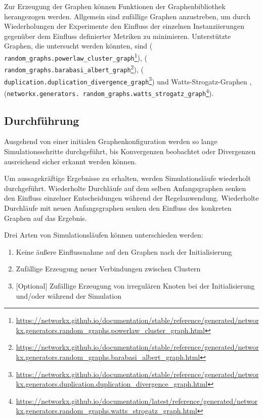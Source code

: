 \documentclass[11pt, a4paper]{scrartcl}
\newcommand{\nx}[1]{\texttt{#1}}
\begin{document}
Zur Erzeugung der Graphen können Funktionen der Graphenbibliothek \autocite{networkx} herangezogen werden. Allgemein sind zufällige Graphen anzustreben, um durch Wiederholungen der Experimente den Einfluss der einzelnen Instanziierungen gegenüber dem Einfluss definierter Metriken zu minimieren.
Unterstützte Graphen, die untersucht werden könnten, sind \autocite{Holme2002} (\nx{%
random\_graphs.powerlaw\_cluster\_graph}\footnote{\url{https://networkx.github.io/documentation/stable/reference/generated/networkx.generators.random_graphs.powerlaw_cluster_graph.html}}), \autocite{Barabasi509} (\nx{%
random\_graphs.barabasi\_albert\_graph}\footnote{\url{https://networkx.github.io/documentation/stable/reference/generated/networkx.generators.random_graphs.barabasi_albert_graph.html}}), \autocite{Ispolatov2005} (\nx{%
duplication.duplication\_divergence\_graph}\footnote{\url{https://networkx.github.io/documentation/stable/reference/generated/networkx.generators.duplication.duplication_divergence_graph.html}}) und Watts-Strogatz-Graphen \autocite{Watts1998}, \autocite{Newman1999} (\nx{networkx.generators.%
random\_graphs.watts\_strogatz\_graph}\footnote{\url{https://networkx.github.io/documentation/latest/reference/generated/networkx.generators.random_graphs.watts_strogatz_graph.html}}).

\subsection{Durchführung}
Ausgehend von einer initialen Graphenkonfiguration werden so lange Simulationsschritte durchgeführt, bis Konvergenzen beobachtet oder Divergenzen ausreichend sicher erkannt werden können.

Um aussagekräftige Ergebnisse zu erhalten, werden Simulationsläufe wiederholt durchgeführt. Wiederholte Durchläufe auf dem selben Anfangsgraphen senken den Einfluss einzelner Entscheidungen während der Regelanwendung. Wiederholte Durchläufe mit neuen Anfangsgraphen senken den Einfluss des konkreten Graphen auf das Ergebnis.

Drei Arten von Simulationsläufen können unterschieden werden:
\begin{enumerate}
\item Keine äußere Einflussnahme auf den Graphen nach der Initialisierung
\item Zufällige Erzeugung neuer Verbindungen zwischen Clustern
\item {}[Optional] Zufällige Erzeugung von irregulären Knoten bei der Initialisierung und/oder während der Simulation
\end{enumerate}
\end{document}
